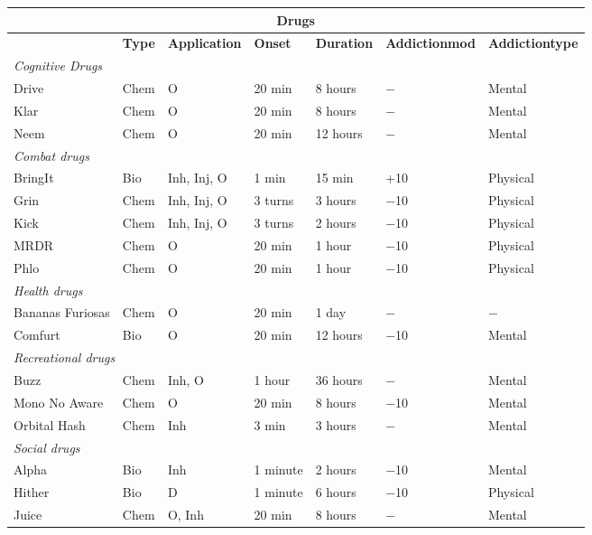\begin{table}
\begin{tabularx}{\textwidth}{|X|l|l|l|l|X|X|}
\hline
\multicolumn{7}{|c|}{\textbf{Drugs}}			\\
\hline
& 				\textbf{Type}	& \textbf{Application}	& \textbf{Onset}	& \textbf{Duration}	& \textbf{Addiction\newline mod}	& \textbf{Addiction\newline type} \\
\hline
\multicolumn{7}{|l|}{\emph{Cognitive Drugs}}			\\
\hline
Drive			& Chem		& O					& 20 min 			& 8 hours			& $-$					& Mental	\\
\hline
Klar				& Chem		& O					& 20 min			& 8 hours			& $-$					& Mental	\\
\hline
Neem				& Chem		& O					& 20 min			& 12 hours		& $-$					& Mental	\\
\hline
\multicolumn{7}{|l|}{\emph{Combat drugs}}			\\
\hline
BringIt			& Bio		& Inh, Inj, O			& 1 min			& 15 min			& +10					& Physical	\\
\hline
Grin				& Chem		& Inh, Inj, O			& 3 turns			& 3 hours			& $-$10					& Physical	\\
\hline
Kick				& Chem		& Inh, Inj, O			& 3 turns			& 2 hours			& $-$10					& Physical	\\
\hline
MRDR				& Chem		& O					& 20 min			& 1 hour			& $-$10					& Physical	\\
\hline
Phlo				& Chem		& O					& 20 min			& 1 hour			& $-$10					& Physical	\\
\hline
\multicolumn{7}{|l|}{\emph{Health drugs}}			\\
\hline
Bananas Furiosas	& Chem		& O					& 20 min			& 1 day			& $-$					& $-$	\\
\hline
Comfurt			& Bio		& O					& 20 min			& 12 hours		& $-$10					& Mental	\\
\hline
\multicolumn{7}{|l|}{\emph{Recreational drugs}}			\\
\hline
Buzz				& Chem		& Inh, O				& 1 hour			& 36 hours		& $-$					& Mental	\\
\hline
Mono No Aware		& Chem		& O					& 20 min			& 8 hours			& $-$10					& Mental	\\
\hline
Orbital Hash		& Chem		& Inh				& 3 min			& 3 hours			& $-$					& Mental	\\
\hline
\multicolumn{7}{|l|}{\emph{Social drugs}}			\\
\hline
Alpha			& Bio		& Inh				& 1 minute		& 2 hours			& $-$10					& Mental	\\
\hline
Hither			& Bio		& D					& 1 minute		& 6 hours			& $-$10					& Physical	\\
\hline
Juice			& Chem		& O, Inh				& 20 min			& 8 hours			& $-$					& Mental	\\
\hline
\end{tabularx}
\end{table}

